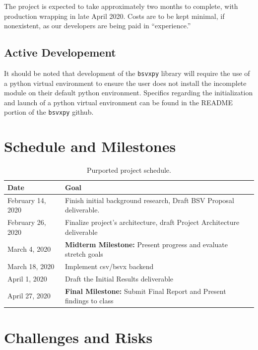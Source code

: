 \documentclass[10pt]{article}
\begin{document}
\indent{}
The project is expected to take approximately two months to complete, with production wrapping in late April 2020.
Costs are to be kept minimal, if nonexistent, as our developers are being paid in “experience.”

\subsection*{Active Developement}
\indent{}
It should be noted that development of the \texttt{bsvxpy} library will require the use of a python virtual environment to ensure the user does not install the incomplete module on their default python environment.
Specifics regarding the initialization and launch of a python virtual environment can be found in the README portion of the \texttt{bsvxpy} github.

\section*{Schedule and Milestones}

\begin{table}[H]
\centering
\begin{tabular}{|p{80pt}|p{375pt}|}
\hline
\textbf{Date} & \textbf{Goal} \\ \hline
February 14, 2020 & Finish initial background research, Draft BSV Proposal deliverable. \\ \hline
February 26, 2020 & Finalize project's architecture, draft Project Architecture deliverable\\ \hline
March 4, 2020 & \textbf{Midterm Milestone:} Present progress and evaluate stretch goals \\ \hline
March 18, 2020 & Implement csv/bsvx backend\\ \hline
April 1, 2020 & Draft the Initial Results deliverable \\ \hline
April 27, 2020& \textbf{Final Milestone:} Submit Final Report and Present findings to class \\ \hline
\end{tabular}
\caption{Purported project schedule.}
\label{tab:approach_schedule}
\end{table}

\section*{Challenges and Risks}
\end{document}
